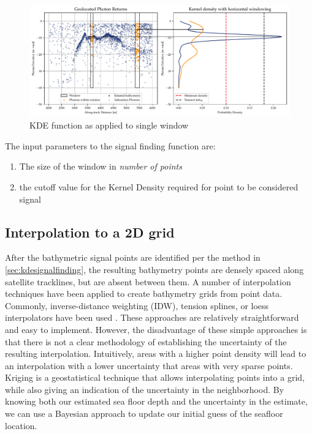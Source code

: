 \begin{figure}[htbp]
    \centering
    \includegraphics[width=\textwidth]{figures/2d_kde_plot.pdf}
    \caption{KDE function as applied to single window}
    \label{fig:kdefunc}
\end{figure}

The input parameters to the signal finding function are:

\begin{enumerate}
    \item The size of the window in \emph{number of points}
    \item the cutoff value for the Kernel Density required for point to be considered signal
\end{enumerate}

\subsection{Interpolation to a 2D grid}

After the bathymetric signal points are identified per the method in \ref{sec:kdesignalfinding}, the resulting bathymetry points are densely spaced along satellite tracklines, but are absent between them. A number of interpolation techniques have been applied to create bathymetry grids from point data. Commonly, inverse-distance weighting (IDW), tension splines, or loess interpolators have been used \parencite{gebcocookbook,Ferreira2017}. These approaches are relatively straightforward and easy to implement. However, the disadvantage of these simple approaches is that there is not a clear methodology of establishing the uncertainty of the resulting interpolation. Intuitively, areas with a higher point density will lead to an interpolation with a lower uncertainty that areas with very sparse points. Kriging is a geostatistical technique that allows interpolating points into a grid, while also giving an indication of the uncertainty in the neighborhood. By knowing both our estimated sea floor depth and the uncertainty in the estimate, we can use a Bayesian approach to update our initial guess of the seafloor location.


